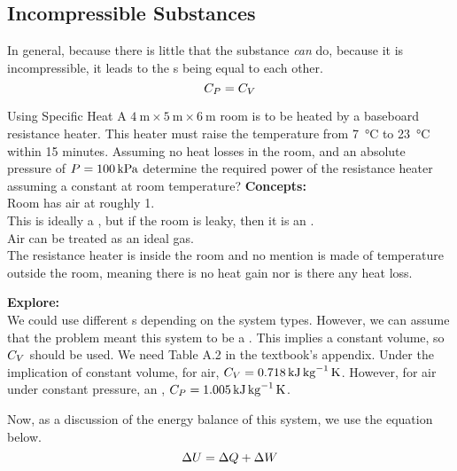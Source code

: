 \subsection{Incompressible Substances}\label{subsubsec:Incompressible_Substances}
In general, because there is little that the substance \textit{can} do, because it is incompressible, it leads to the s being equal to each other.
\begin{equation*}
  C_{P} = C_{V}
\end{equation*}

\begin{example}{Using Specific Heat}
  A $\SI{4}{\meter} \times \SI{5}{\meter} \times \SI{6}{\meter}$ room is to be heated by a baseboard resistance heater.
  This heater must raise the temperature from \SI{7}{\degreeCelsius} to \SI{23}{\degreeCelsius} within 15 minutes.
  Assuming no heat losses in the room, and an absolute pressure of $P = \SI{100}{\kilo\pascal}$ determine the required power of the resistance heater assuming a constant  at room temperature?
  \tcblower{}
  \textbf{Concepts:} \\
  Room has air at roughly \SI{1}{\atm}. \\
  This is ideally a , but if the room is leaky, then it is an . \\
  Air can be treated as an ideal gas. \\
  The resistance heater is inside the room and no mention is made of temperature outside the room, meaning there is no heat gain nor is there any heat loss.

  \textbf{Explore:} \\
  We could use different s depending on the system types.
  However, we can assume that the problem meant this system to be a .
  This implies a constant volume, so $C_{V}$ should be used.
  We need Table A.2 in the textbook's appendix.
  Under the implication of constant volume, for air, $C_{V} = \SI{0.718}{\kilo\joule\per\kilo\gram\kelvin}$.
  However, for air under constant pressure, an , $C_{P} = \SI{1.005}{\kilo\joule\per\kilo\gram\kelvin}$.

  Now, as a discussion of the energy balance of this system, we use the equation below.
  \begin{equation*}
    \Delta U = \Delta Q + \Delta W
  \end{equation*}


\end{example}
